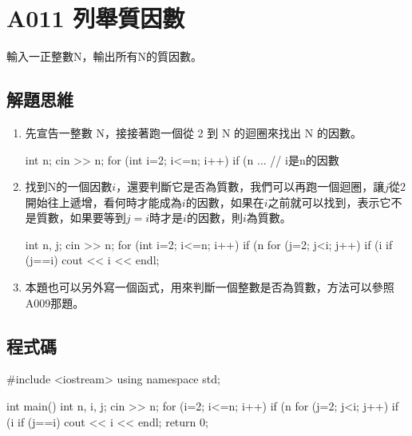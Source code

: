 \section{A011 列舉質因數}
輸入一正整數N，輸出所有N的質因數。

\subsection{解題思維}

\begin{enumerate}
	\item
	先宣告一整數 N，接接著跑一個從 2 到 N 的迴圈來找出 N 的因數。
	\begin{inside}
	int n;
	cin >> n;
	for (int i=2; i<=n; i++) {
		if (n%
		... // i是n的因數
	}
	\end{inside}
	\item
	找到N的一個因數$i$，還要判斷它是否為質數，我們可以再跑一個迴圈，讓$j$從2開始往上遞增，看何時才能成為$i$的因數，如果在$i$之前就可以找到，表示它不是質數，如果要等到$j=i$時才是$i$的因數，則$i$為質數。
	\begin{inside}
	int n, j;
	cin >> n;
	for (int i=2; i<=n; i++) {
		if (n%
		for (j=2; j<i; j++) if (i%
		if (j==i) cout << i << endl;
	}
	\end{inside}
	\item 本題也可以另外寫一個函式，用來判斷一個整數是否為質數，方法可以參照A009那題。
	
\end{enumerate} 

\subsection{程式碼}
\begin{cppcode}
	#include <iostream>
	using namespace std;
	
	int main()
	{
		int n, i, j;
		cin >> n;
		for (i=2; i<=n; i++) {
			if (n%
			for (j=2; j<i; j++) if (i%
			if (j==i) cout << i << endl;
		}
		return 0;
	}
\end{cppcode}

